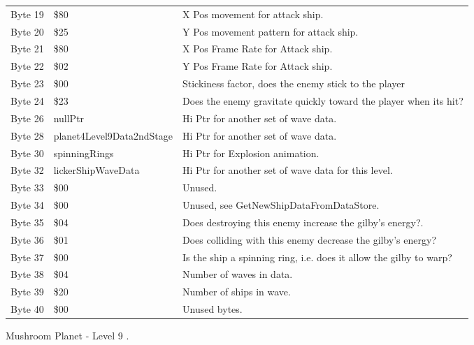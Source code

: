 \begin{figure}[H]
{\begin{adjustbox}{width=12cm}
\begin{tabular}{lll}
 Byte 19 & \$80                       & X Pos movement for attack ship.                                    \\
 Byte 20 & \$25                       & Y Pos movement pattern for attack ship.                            \\
 Byte 21 & \$80                       & X Pos Frame Rate for Attack ship.                                  \\
 Byte 22 & \$02                       & Y Pos Frame Rate for Attack ship.                                  \\
 Byte 23 & \$00                       & Stickiness factor, does the enemy stick to the player              \\
 Byte 24 & \$23                       & Does the enemy gravitate quickly toward the player when its hit?   \\
 Byte 26 & nullPtr                   & Hi Ptr for another set of wave data.                               \\
 Byte 28 & planet4Level9Data2ndStage & Hi Ptr for another set of wave data.                               \\
 Byte 30 & spinningRings             & Hi Ptr for Explosion animation.                                    \\
 Byte 32 & lickerShipWaveData        & Hi Ptr for another set of wave data for this level.                \\
 Byte 33 & \$00                       & Unused.                                                            \\
 Byte 34 & \$00                       & Unused, see GetNewShipDataFromDataStore.                           \\
 Byte 35 & \$04                       & Does destroying this enemy increase the gilby's energy?.           \\
 Byte 36 & \$01                       & Does colliding with this enemy decrease the gilby's energy?        \\
 Byte 37 & \$00                       & Is the ship a spinning ring, i.e. does it allow the gilby to warp? \\
 Byte 38 & \$04                       & Number of waves in data.                                           \\
 Byte 39 & \$20                       & Number of ships in wave.                                           \\
 Byte 40 & \$00                       & Unused bytes.                                                      \\
\bottomrule
\end{tabular}

  \end{adjustbox}

  }\caption*{Mushroom Planet - Level 9
.}
\end{figure}

